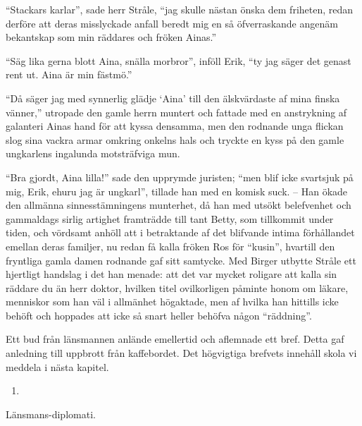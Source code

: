 ``Stackars karlar'', sade herr Stråle, ``jag skulle nästan önska dem
friheten, redan derföre att deras misslyckade anfall beredt mig en så
öfverraskande angenäm bekantskap som min räddares och fröken Ainas.''

``Säg lika gerna blott Aina, snälla morbror'', inföll Erik, ``ty jag
säger det genast rent ut. Aina är min fästmö.''

``Då säger jag med synnerlig glädje `Aina' till den älskvärdaste af mina
finska vänner,'' utropade den gamle herrn muntert och fattade med en
anstrykning af galanteri Ainas hand för att kyssa densamma, men den
rodnande unga flickan slog sina vackra armar omkring onkelns hals och
tryckte en kyss på den gamle ungkarlens ingalunda motsträfviga mun.

``Bra gjordt, Aina lilla!'' sade den upprymde juristen; ``men blif icke
svartsjuk på mig, Erik, ehuru jag är ungkarl'', tillade han med en
komisk suck. -- Han ökade den allmänna sinnesstämningens munterhet, då
han med utsökt belefvenhet och gammaldags sirlig artighet framträdde
till tant Betty, som tillkommit under tiden, och vördsamt anhöll att i
betraktande af det blifvande intima förhållandet emellan deras familjer,
nu redan få kalla fröken Ros för ``kusin'', hvartill den fryntliga gamla
damen rodnande gaf sitt samtycke. Med Birger utbytte Stråle ett
hjertligt handslag i det han menade: att det var mycket roligare att
kalla sin räddare du än herr doktor, hvilken titel ovilkorligen påminte
honom om läkare, menniskor som han väl i allmänhet högaktade, men af
hvilka han hittills icke behöft och hoppades att icke så snart heller
behöfva någon ``räddning''.

Ett bud från länsmannen anlände emellertid och aflemnade ett bref. Detta
gaf anledning till uppbrott från kaffebordet. Det högvigtiga brefvets
innehåll skola vi meddela i nästa kapitel.

\begin{enumerate}
\def\labelenumi{\arabic{enumi}.}
\setcounter{enumi}{21}
\tightlist
\item
\end{enumerate}

Länsmans-diplomati.

